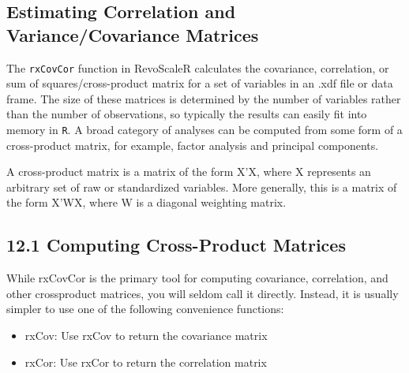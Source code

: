 \subsection*{Estimating Correlation and Variance/Covariance Matrices}

The \texttt{rxCovCor} function in RevoScaleR calculates the covariance, correlation, or sum of
squares/cross-product matrix for a set of variables in an .xdf file or data frame. The size of these
matrices is determined by the number of variables rather than the number of observations, so
typically the results can easily fit into memory in \texttt{R}. A broad category of analyses can be
computed from some form of a cross-product matrix, for example, factor analysis and principal
components.

A cross-product matrix is a matrix of the form X'X, where X represents an arbitrary set of raw or
standardized variables. More generally, this is a matrix of the form X'WX, where W is a diagonal
weighting matrix.

\subsection*{12.1 Computing Cross-Product Matrices}
While rxCovCor is the primary tool for computing covariance, correlation, and other crossproduct
matrices, you will seldom call it directly. Instead, it is usually simpler to use one of the
following convenience functions:
\begin{itemize}
\item rxCov: Use rxCov to return the covariance matrix
\item rxCor: Use rxCor to return the correlation matrix
\end{itemize}
